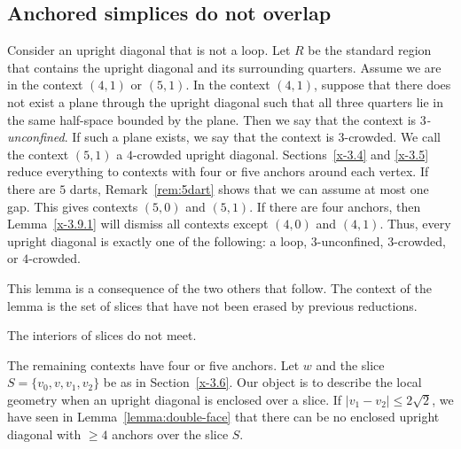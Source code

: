\subsection{Anchored simplices do not overlap} %



\begin{definition}
Consider an upright diagonal that is not a loop. Let $R$ be the
standard region that contains the upright diagonal and its
surrounding quarters.  Assume we are in the context $(4,1)$ or
$(5,1)$.  In the context $(4,1)$, suppose that there does not exist
a plane through the upright diagonal such that all three quarters
lie in the same half-space bounded by the plane. Then we say that
the context is {\it $3$-unconfined}. If such a plane exists, we say
that the context is $3$-crowded. We call the context $(5,1)$ a
$4$-crowded upright diagonal. Sections~\ref{x-3.4} and \ref{x-3.5}
reduce everything to contexts with four or five anchors around each
vertex.  If there are $5$ darts, 
Remark~\ref{rem:5dart} shows that we can assume at most one
gap. This gives contexts $(5,0)$ and $(5,1)$.  If there are four
anchors, then Lemma~\ref{x-3.9.1} will dismiss all contexts except
$(4,0)$ and $(4,1)$. Thus, every upright diagonal is exactly one of
the following: a loop, $3$-unconfined, $3$-crowded, or $4$-crowded.
\end{definition}


This lemma is a consequence of the two others that follow. The
context of the lemma is the set of slices that have
not been erased by previous reductions.

\begin{lemma}
    \label{lemma:anchor-no-overlap}
The interiors of slices do not meet.
\end{lemma}

The remaining contexts have four or  five anchors. Let $w$ and the
slice $S=\{v_0,v,v_1,v_2\}$ be as in Section~\ref{x-3.6}.
Our object is to describe the local geometry when an upright
diagonal is enclosed over a slice. If $|v_1-v_2|\le
2\sqrt{2}$, we have seen in Lemma~\ref{lemma:double-face} that
there can be no enclosed upright diagonal with $\ge 4$ anchors
over the slice $S$.

